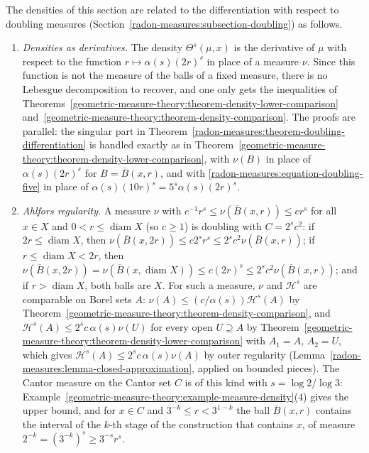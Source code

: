 \begin{remark}\label{geometric-measure-theory:remark-doubling-densities}
The densities of this section are related to the differentiation with respect to doubling measures (Section~\ref{radon-measures:subsection-doubling}) as follows.
\begin{enumerate}
\item \emph{Densities as derivatives.} The density $\Theta^s(\mu, x)$ is the derivative of $\mu$ with respect to the function $r \mapsto \alpha(s)(2r)^s$ in place of a measure $\nu$. Since this function
is not the measure of the balls of a fixed measure, there is no Lebesgue decomposition to recover, and one only gets the inequalities of Theorems~\ref{geometric-measure-theory:theorem-density-lower-comparison}
and~\ref{geometric-measure-theory:theorem-density-comparison}. The proofs are parallel: the singular part in Theorem~\ref{radon-measures:theorem-doubling-differentiation} is handled exactly as in Theorem~\ref{geometric-measure-theory:theorem-density-lower-comparison}, with
$\nu(B)$ in place of $\alpha(s)(2r)^s$ for $B = \overline{B}(x, r)$, and with \eqref{radon-measures:equation-doubling-five} in place of $\alpha(s)(10r)^s = 5^s\alpha(s)(2r)^s$.
\item \emph{Ahlfors regularity.} A measure $\nu$ with $c^{-1}r^s \leq \nu(\overline{B}(x, r)) \leq cr^s$ for all $x \in X$ and $0 < r \leq \operatorname{diam}X$ (so $c \geq 1$) is doubling with
$C = 2^sc^2$: if $2r \leq \operatorname{diam}X$, then $\nu(\overline{B}(x, 2r)) \leq c2^sr^s \leq 2^sc^2\nu(\overline{B}(x, r))$; if $r \leq \operatorname{diam}X < 2r$, then
$\nu(\overline{B}(x, 2r)) = \nu(\overline{B}(x, \operatorname{diam}X)) \leq c(2r)^s \leq 2^sc^2\nu(\overline{B}(x, r))$; and if $r > \operatorname{diam}X$, both balls are $X$. For such a measure, $\nu$ and
$\mathcal{H}^s$ are comparable on Borel sets $A$: $\nu(A) \leq (c/\alpha(s))\mathcal{H}^s(A)$ by Theorem~\ref{geometric-measure-theory:theorem-density-comparison}, and
$\mathcal{H}^s(A) \leq 2^sc\,\alpha(s)\nu(U)$ for every open $U \supseteq A$ by Theorem~\ref{geometric-measure-theory:theorem-density-lower-comparison} with $A_1 = A$, $A_2 = U$, which gives
$\mathcal{H}^s(A) \leq 2^sc\,\alpha(s)\nu(A)$ by outer regularity (Lemma~\ref{radon-measures:lemma-closed-approximation}, applied on bounded pieces). The Cantor measure on the Cantor set $C$ is of this
kind with $s = \log 2/\log 3$: Example~\ref{geometric-measure-theory:example-measure-density}(4) gives the upper bound, and for $x \in C$ and $3^{-k} \leq r < 3^{1-k}$ the ball $\overline{B}(x, r)$ contains the
interval of the $k$-th stage of the construction that contains $x$, of measure $2^{-k} = (3^{-k})^s \geq 3^{-s}r^s$.
\end{enumerate}
\end{remark}

